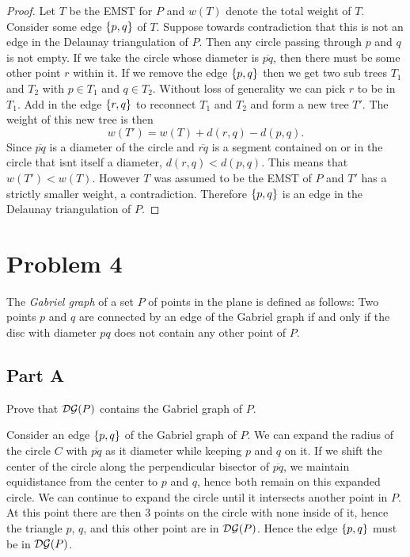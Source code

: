 \documentclass[12pt]{extarticle}
\begin{document}
\begin{proof}
    Let $T$ be the EMST for $P$ and $w(T)$ denote the total weight of $T$. Consider some edge $\qty{p,q}$ of $T$. Suppose towards contradiction that this is not an edge in the Delaunay triangulation of $P$. Then any circle passing through $p$ and $q$ is not empty. If we take the circle whose diameter is $\overline{pq}$, then there must be some other point $r$ within it. If we remove the edge $\qty{p,q}$ then we get two sub trees $T_1$ and $T_2$ with $p \in T_1$ and $q \in T_2$. Without loss of generality we can pick $r$ to be in $T_1$. Add in the edge $\qty{r,q}$ to reconnect $T_1$ and $T_2$ and form a new tree $T'$. The weight of this new tree is then
    \[
        w(T') = w(T) + d(r,q) - d(p,q)
    .\]
    Since $\overline{pq}$ is a diameter of the circle and $\overline{rq}$ is a segment contained on or in the circle that isnt itself a diameter, $d(r,q) < d(p,q)$. This means that $w(T') < w(T)$. However $T$ was assumed to be the EMST of $P$ and $T'$ has a strictly smaller weight, a contradiction. Therefore $\qty{p,q}$ is an edge in the Delaunay triangulation of $P$.
\end{proof}

\section*{Problem 4}
The \textit{Gabriel graph} of a set $P$ of points in the plane is defined as follows: Two points $p$ and $q$ are connected by an edge of the Gabriel graph if and only if the disc with diameter $pq$ does not contain any other point of $P$.

\subsection*{Part A}
Prove that $\mathcal{DG}(P)$ contains the Gabriel graph of $P$.

\begin{solution}
    Consider an edge $\qty{p, q}$ of the Gabriel graph of $P$. We can expand the radius of the circle $C$ with $\overline{pq}$ as it diameter while keeping $p$ and $q$ on it. If we shift the center of the circle along the perpendicular bisector of $\overline{pq}$, we maintain equidistance from the center to $p$ and $q$, hence both remain on this expanded circle. We can continue to expand the circle until it intersects another point in $P$. At this point there are then $3$ points on the circle with none inside of it, hence the triangle $p$, $q$, and this other point are in $\mathcal{DG}(P)$. Hence the edge $\qty{p,q}$ must be in $\mathcal{DG}(P)$.
\end{solution}
\end{document}
